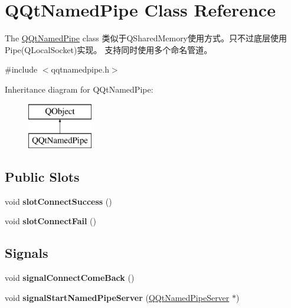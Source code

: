 \hypertarget{class_q_qt_named_pipe}{}\section{Q\+Qt\+Named\+Pipe Class Reference}
\label{class_q_qt_named_pipe}


The \mbox{\hyperlink{class_q_qt_named_pipe}{Q\+Qt\+Named\+Pipe}} class 类似于\+Q\+Shared\+Memory使用方式。只不过底层使用\+Pipe(\+Q\+Local\+Socket)实现。 支持同时使用多个命名管道。  




{\ttfamily \#include $<$qqtnamedpipe.\+h$>$}

Inheritance diagram for Q\+Qt\+Named\+Pipe\+:\begin{figure}[H]
\begin{center}
\leavevmode
\includegraphics[height=2.000000cm]{class_q_qt_named_pipe}
\end{center}
\end{figure}
\subsection*{Public Slots}
\begin{DoxyCompactItemize}
\item 
\mbox{\label{class_q_qt_named_pipe_adef0cdb3aa9bc64c2ddbb4db4540807a}} 
void {\bfseries slot\+Connect\+Success} ()
\item 
\mbox{\label{class_q_qt_named_pipe_a1cc0bb1e7db80271796bd30f7a609f15}} 
void {\bfseries slot\+Connect\+Fail} ()
\end{DoxyCompactItemize}
\subsection*{Signals}
\begin{DoxyCompactItemize}
\item 
\mbox{\label{class_q_qt_named_pipe_ac25735927cc38bafe0fc2f06a44dc37d}} 
void {\bfseries signal\+Connect\+Come\+Back} ()
\item 
\mbox{\label{class_q_qt_named_pipe_a875906677b186a2936098cf132dc7fac}} 
void {\bfseries signal\+Start\+Named\+Pipe\+Server} (\mbox{\hyperlink{class_q_qt_named_pipe_server}{Q\+Qt\+Named\+Pipe\+Server}} $\ast$)
\end{DoxyCompactItemize}
